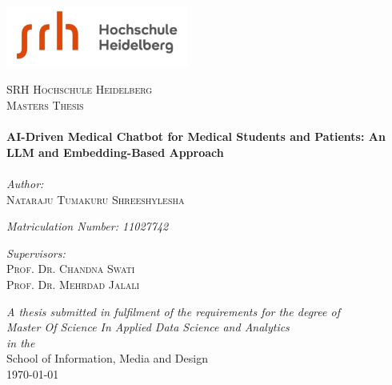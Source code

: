 \documentclass[12pt, oneside]{Thesis}
\def\ttitle{AI-Driven Medical Chatbot for Medical Students and Patients: An LLM and Embedding-Based Approach}
\def\authornames{Nataraju Tumakuru Shreeshylesha}
\def\supname{Prof. Dr. Chandna Swati\\ Prof. Dr. Mehrdad Jalali}
\def\degreename{Master Of Science In Applied Data Science and Analytics}
\def\univname{SRH Hochschule Heidelberg}
\def\deptname{School of Information, Media and Design}
\begin{document}
\begin{titlepage}
    \begin{center}
      \includegraphics[width=6cm]{./Images/SRHLogo.png} %

        \textsc{\LARGE \univname}\\[1.5cm] %
        \textsc{\Large Masters Thesis}\\[0.5cm] %

        \HRule \\[0.4cm] %
        {\huge \bfseries \ttitle}\\[0.4cm] %
        \HRule \\[1.5cm] %
        \large
        \emph{Author:}\\[0.2cm]
        \textsc{\authornames} %

        \emph{Matriculation Number: 11027742} 

        \large
        \emph{Supervisors:} \\[0.2cm]
        \textsc{\supname} %

      
        \large \textit{A thesis submitted in fulfilment of the requirements for the degree of \\\degreename}\\[0.3cm] %
        \textit{in the}\\[0.2cm]

        \deptname\\[1.2cm] %
        {\large \mydateformat\today}\\[1cm]  %
        

        \vfill
    \end{center}
  \end{titlepage}
\end{document}
